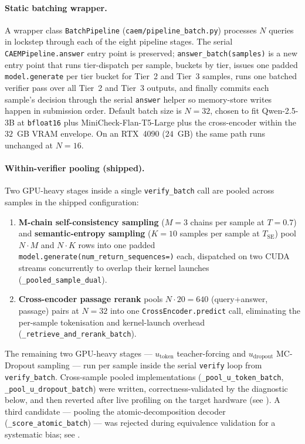 \paragraph{Static batching wrapper.}
A wrapper class \texttt{BatchPipeline}
(\texttt{caem/pipeline\_batch.py}) processes $N$ queries in lockstep
through each of the eight pipeline stages. The serial
\texttt{CAEMPipeline.answer} entry point is preserved;
\texttt{answer\_batch(samples)} is a new entry point that runs
tier-dispatch per sample, buckets by tier, issues one padded
\texttt{model.generate} per tier bucket for Tier~2 and Tier~3
samples, runs one batched verifier pass over all Tier~2 and Tier~3
outputs, and finally commits each sample's decision through the
serial \texttt{answer} helper so memory-store writes happen in
submission order. Default batch size is $N = 32$, chosen to fit
Qwen-2.5-3B at \texttt{bfloat16} plus MiniCheck-Flan-T5-Large plus
the cross-encoder within the $32$~GB VRAM envelope. On an RTX~4090
($24$~GB) the same path runs unchanged at $N = 16$.

\paragraph{Within-verifier pooling (shipped).}
Two GPU-heavy stages inside a single \texttt{verify\_batch} call are
pooled across samples in the shipped configuration:
\begin{enumerate}
\item \textbf{M-chain self-consistency sampling}
  ($M = 3$ chains per sample at $T = 0.7$) and \textbf{semantic-entropy
  sampling} ($K = 10$ samples per sample at $T_{\text{SE}}$) pool
  $N \cdot M$ and $N \cdot K$ rows into one padded
  \texttt{model.generate(num\_return\_sequences=\cdot)} each,
  dispatched on two CUDA streams concurrently to overlap their
  kernel launches (\texttt{\_pooled\_sample\_dual}).
\item \textbf{Cross-encoder passage rerank} pools $N \cdot 20 = 640$
  (query+answer, passage) pairs at $N = 32$ into one
  \texttt{CrossEncoder.predict} call, eliminating the per-sample
  tokenisation and kernel-launch overhead
  (\texttt{\_retrieve\_and\_rerank\_batch}).
\end{enumerate}
The remaining two GPU-heavy stages --- $u_{\text{token}}$
teacher-forcing and $u_{\text{dropout}}$ MC-Dropout sampling --- run
per sample inside the serial \texttt{verify} loop from
\texttt{verify\_batch}. Cross-sample pooled implementations
(\texttt{\_pool\_u\_token\_batch}, \texttt{\_pool\_u\_dropout\_batch})
were written, correctness-validated by the diagnostic below, and then
reverted after live profiling on the target hardware (see
). A third candidate --- pooling the
atomic-decomposition decoder (\texttt{\_score\_atomic\_batch}) ---
was rejected during equivalence validation for a systematic bias; see
.

